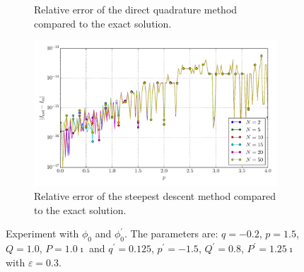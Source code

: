 \documentclass[a4paper,10pt]{article}
\begin{document}
\begin{figure}[ht!]
\begin{subfigure}[t]{0.5\linewidth}
    \caption{Relative error of the direct quadrature method compared to the exact solution.}
    \label{fig:tp_1d_conv_p_0_0_err_rel_qr}
  \end{subfigure}
  \begin{subfigure}[t]{0.5\linewidth}
    \includegraphics[width=\linewidth]{./plots/tp_1d_conv_p_0_0_err_rel_nsd.pdf}
    \caption{Relative error of the steepest descent method compared to the exact solution.}
    \label{fig:tp_1d_conv_p_0_0_err_rel_nsd}
  \end{subfigure}
  \label{fig:tp_1d_conv_p_0_0}
  \caption{Experiment with $\phi_{0}$ and $\phi_{0}^{\prime}$.
  The parameters are:
  $q=-0.2$, $p=1.5$, $Q=1.0$, $P=1.0\imath$ and
  $q^\prime=0.125$, $p^\prime=-1.5$, $Q^\prime=0.8$, $P^\prime=1.25\imath$
  with $\varepsilon = 0.3$.}
\end{figure}
\end{document}
